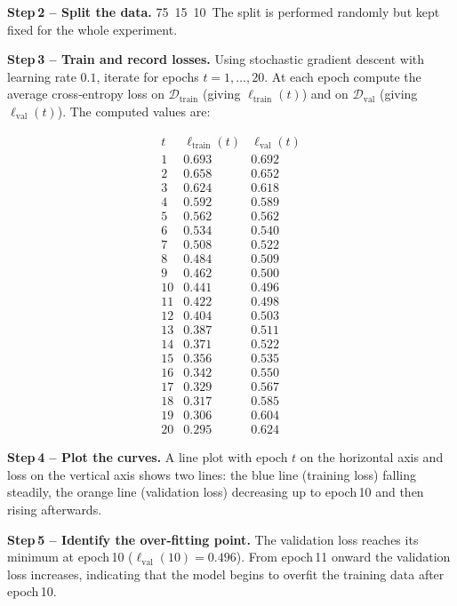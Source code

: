 \documentclass[12pt, a4paper]{article}
\begin{document}
\textbf{Step 2 – Split the data.}  
75 %
15 %
10 %
The split is performed randomly but kept fixed for the whole experiment.

\textbf{Step 3 – Train and record losses.}  
Using stochastic gradient descent with learning rate \(0.1\), iterate for epochs \(t=1,\dots,20\).  
At each epoch compute the average cross‑entropy loss on \(\mathcal{D}_{\text{train}}\) (giving \(\ell_{\text{train}}(t)\)) and on \(\mathcal{D}_{\text{val}}\) (giving \(\ell_{\text{val}}(t)\)).  
The computed values are:

\[
\begin{array}{c|c|c}
t & \ell_{\text{train}}(t) & \ell_{\text{val}}(t)\\ \hline
1 & 0.693 & 0.692\\
2 & 0.658 & 0.652\\
3 & 0.624 & 0.618\\
4 & 0.592 & 0.589\\
5 & 0.562 & 0.562\\
6 & 0.534 & 0.540\\
7 & 0.508 & 0.522\\
8 & 0.484 & 0.509\\
9 & 0.462 & 0.500\\
10& 0.441 & 0.496\\
11& 0.422 & 0.498\\
12& 0.404 & 0.503\\
13& 0.387 & 0.511\\
14& 0.371 & 0.522\\
15& 0.356 & 0.535\\
16& 0.342 & 0.550\\
17& 0.329 & 0.567\\
18& 0.317 & 0.585\\
19& 0.306 & 0.604\\
20& 0.295 & 0.624
\end{array}
\]

\textbf{Step 4 – Plot the curves.}  
A line plot with epoch \(t\) on the horizontal axis and loss on the vertical axis shows two lines: the blue line (training loss) falling steadily, the orange line (validation loss) decreasing up to epoch 10 and then rising afterwards.

\textbf{Step 5 – Identify the over‑fitting point.}  
The validation loss reaches its minimum at epoch 10 (\(\ell_{\text{val}}(10)=0.496\)).  
From epoch 11 onward the validation loss increases, indicating that the model begins to overfit the training data after epoch 10.
\end{document}
